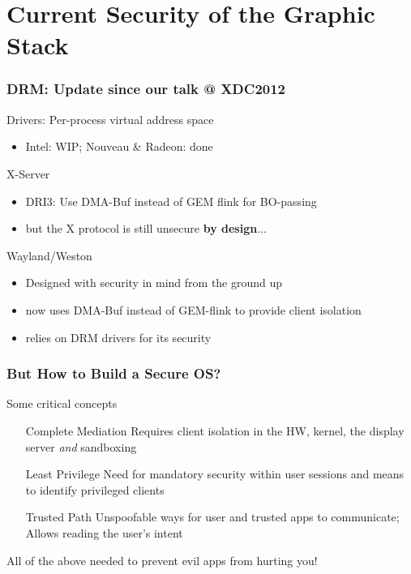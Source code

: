 \section{Current Security of the Graphic Stack}

\begin{frame}
\frametitle{DRM: Update since our talk @ XDC2012}
	\begin{block}{Drivers: Per-process virtual address space}
		\begin{itemize}
			\item Intel: WIP; Nouveau \& Radeon: done
		\end{itemize}
	\end{block}

	\begin{block}{X-Server}
		\begin{itemize}
			\item DRI3: Use DMA-Buf instead of GEM flink for BO-passing
			\item but the X protocol is still unsecure \textbf{by design}...
		\end{itemize}
	\end{block}

	\begin{block}{Wayland/Weston}
		\begin{itemize}
			\item Designed with security in mind from the ground up
			\item now uses DMA-Buf instead of GEM-flink to provide client isolation
			\item relies on DRM drivers for its security
		\end{itemize}
	\end{block}
\end{frame}

\begin{frame}
\frametitle{But How to Build a Secure OS?}

	\begin{block}{Some critical concepts}
	\begin{enumerate}[leftmargin=1.6em]
	\item[Complete Mediation] Requires client isolation in the HW, kernel, the display server \textit{and} sandboxing
	\item[Least Privilege] Need for mandatory security within user sessions	and means to identify privileged clients
	\item[Trusted Path] Unspoofable ways for user and trusted apps to communicate; Allows reading the user's intent
	\end{enumerate}
	\end{block}

	All of the above needed to prevent evil apps from hurting you!
	{\scriptsize\color{xorg-palette-dark}\cite{saltzer_protection_1975,loscocco_inevitability_1998}}

\end{frame}

